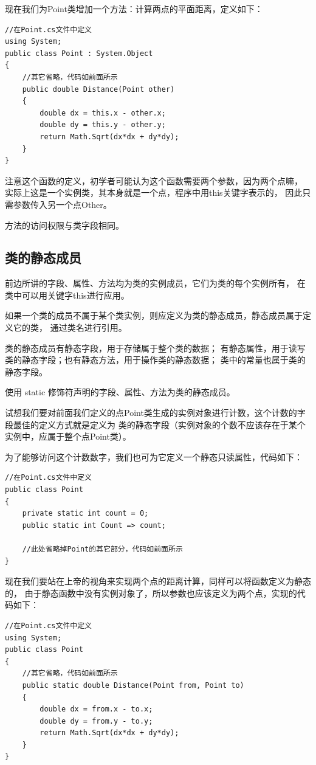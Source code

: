 现在我们为Point类增加一个方法：计算两点的平面距离，定义如下：

\begin{lstlisting}
//在Point.cs文件中定义
using System;
public class Point : System.Object
{ 
    //其它省略，代码如前面所示
    public double Distance(Point other)
    {
        double dx = this.x - other.x;
        double dy = this.y - other.y;
        return Math.Sqrt(dx*dx + dy*dy);
    }    
}
\end{lstlisting}

注意这个函数的定义，初学者可能认为这个函数需要两个参数，因为两个点嘛，
实际上这是一个实例类，其本身就是一个点，程序中用this关键字表示的，
因此只需参数传入另一个点Other。

方法的访问权限与类字段相同。



\subsection{类的静态成员}

前边所讲的字段、属性、方法均为类的实例成员，它们为类的每个实例所有，
在类中可以用关键字this进行应用。

如果一个类的成员不属于某个类实例，则应定义为类的静态成员，静态成员属于定义它的类，
通过类名进行引用。

类的静态成员有静态字段，用于存储属于整个类的数据；
有静态属性，用于读写类的静态字段；也有静态方法，用于操作类的静态数据；
类中的常量也属于类的静态字段。

使用 static 修饰符声明的字段、属性、方法为类的静态成员。

试想我们要对前面我们定义的点Point类生成的实例对象进行计数，这个计数的字段最佳的定义方式就是定义为
类的静态字段（实例对象的个数不应该存在于某个实例中，应属于整个点Point类）。

为了能够访问这个计数数字，我们也可为它定义一个静态只读属性，代码如下：

\begin{lstlisting}
//在Point.cs文件中定义
public class Point
{
    private static int count = 0;
    public static int Count => count;

    //此处省略掉Point的其它部分，代码如前面所示    
}
\end{lstlisting}

现在我们要站在上帝的视角来实现两个点的距离计算，同样可以将函数定义为静态的，
由于静态函数中没有实例对象了，所以参数也应该定义为两个点，实现的代码如下：

\begin{lstlisting}
//在Point.cs文件中定义
using System;
public class Point
{ 
    //其它省略，代码如前面所示
    public static double Distance(Point from, Point to)
    {
        double dx = from.x - to.x;
        double dy = from.y - to.y;
        return Math.Sqrt(dx*dx + dy*dy);
    }    
}
\end{lstlisting}

